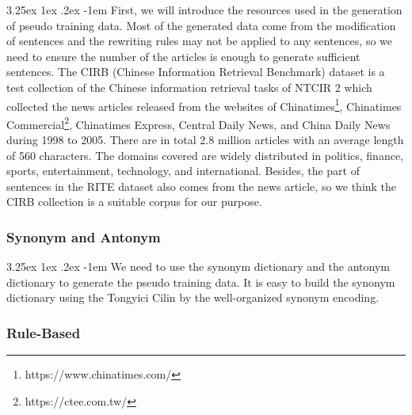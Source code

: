 \documentclass[12pt]{article}
\makeatletter
\renewcommand\paragraph{\@startsection{paragraph}{5}{\z@}%
  {3.25ex \@plus1ex \@minus.2ex}%
  {-1em}%
  {\normalfont\normalsize\bfseries}}
\makeatother
\begin{document}
\begin{CJK*}{UTF8}{bkai}
\begin{spacing}{1.77}
\paragraph{}
First, we will introduce the resources used in the generation of pseudo training data. Most of the generated data come from the modification of sentences and the rewriting rules may not be applied to any sentences, so we need to ensure the number of the articles is enough to generate sufficient sentences. The CIRB (Chinese Information Retrieval Benchmark)\cite{chen2001cirb} dataset is a test collection of the Chinese information retrieval tasks of NTCIR 2 which collected the news articles released from the websites of Chinatimes\footnote{https://www.chinatimes.com/}, Chinatimes Commercial\footnote{https://ctee.com.tw/}, Chinatimes Express, Central Daily News, and China Daily News during 1998 to 2005. There are in total 2.8 million articles with an average length of 560 characters. The domains covered are widely distributed in politics, finance, sports, entertainment, technology, and international. Besides, the part of sentences in the RITE dataset also comes from the news article, so we think the CIRB collection is a suitable corpus for our purpose.

\subsubsection{Synonym and Antonym}
\paragraph{}
We need to use the synonym dictionary and the antonym dictionary to generate the pseudo training data. It is easy to build the synonym dictionary using the Tongyici Cilin by the well-organized synonym encoding.

\subsubsection{Rule-Based}

\end{spacing}
\end{CJK*}
\end{document}
